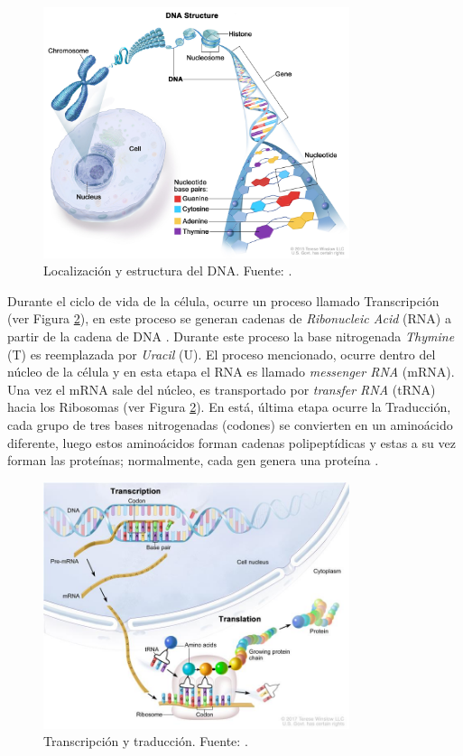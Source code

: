 \begin{figure}[H]
	\centering
	\includegraphics[width=0.8\textwidth]{../img/neoantigen/dna}
	\caption{Localización y estructura del DNA. Fuente:  \cite{NCIdictionary2022}.}	
	\label{img:dnalocation}
\end{figure}

Durante el ciclo de vida de la célula, ocurre un proceso llamado Transcripción (ver Figura \ref{img:trans}), en este proceso se generan cadenas de \textit{Ribonucleic Acid} (RNA) a partir de la cadena de DNA \citep{NCIdictionary2022}.  Durante este proceso la base nitrogenada \textit{Thymine} (T) es reemplazada por \textit{Uracil} (U). El proceso mencionado, ocurre dentro del núcleo de la célula y en esta etapa el RNA es llamado \textit{messenger RNA} (mRNA). Una vez el mRNA sale del núcleo, es transportado por \textit{transfer RNA} (tRNA) hacia los Ribosomas (ver Figura \ref{img:trans}). En está, última etapa ocurre la Traducción, cada grupo de tres bases nitrogenadas (codones) se convierten en un aminoácido diferente, luego estos aminoácidos forman cadenas polipeptídicas y estas a su vez forman las proteínas; normalmente, cada gen genera una proteína \citep{xiong2006essential, NCIdictionary2022}.



\begin{figure}[]
	\centering
	\includegraphics[width=0.8\textwidth]{../img/neoantigen/trans}
	\caption{Transcripción y traducción. Fuente:  \cite{nci2020}.}	
	\label{img:trans}
\end{figure}

